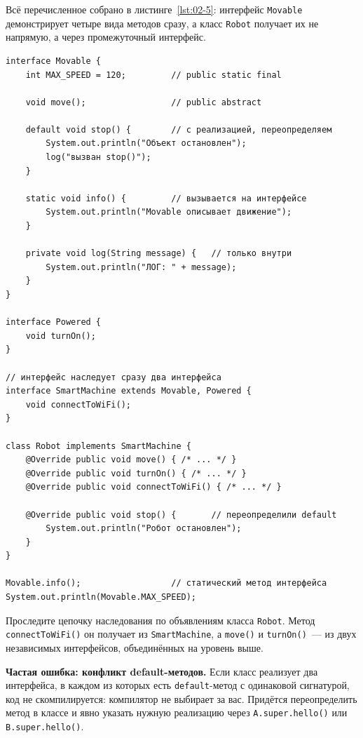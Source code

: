 Всё перечисленное собрано в листинге~\ref{lst:02-5}: интерфейс
\texttt{Movable} демонстрирует четыре вида методов сразу, а класс
\texttt{Robot} получает их не напрямую, а через промежуточный интерфейс.

\begin{listing}[H]
\begin{verbatim}
interface Movable {
    int MAX_SPEED = 120;         // public static final

    void move();                 // public abstract

    default void stop() {        // с реализацией, переопределяем
        System.out.println("Объект остановлен");
        log("вызван stop()");
    }

    static void info() {         // вызывается на интерфейсе
        System.out.println("Movable описывает движение");
    }

    private void log(String message) {   // только внутри
        System.out.println("ЛОГ: " + message);
    }
}

interface Powered {
    void turnOn();
}

// интерфейс наследует сразу два интерфейса
interface SmartMachine extends Movable, Powered {
    void connectToWiFi();
}

class Robot implements SmartMachine {
    @Override public void move() { /* ... */ }
    @Override public void turnOn() { /* ... */ }
    @Override public void connectToWiFi() { /* ... */ }

    @Override public void stop() {       // переопределили default
        System.out.println("Робот остановлен");
    }
}

Movable.info();                  // статический метод интерфейса
System.out.println(Movable.MAX_SPEED);
\end{verbatim}
\caption{Четыре вида методов интерфейса и множественное наследование}
\label{lst:02-5}
\end{listing}

Проследите цепочку наследования по объявлениям класса \texttt{Robot}. Метод
\texttt{connectToWiFi()} он получает из \texttt{SmartMachine}, а
\texttt{move()} и \texttt{turnOn()}~--- из двух независимых интерфейсов,
объединённых на уровень выше.

\begin{oshibka}
\textbf{Частая ошибка: конфликт default-методов.} Если класс реализует два
интерфейса, в каждом из которых есть \texttt{default}-метод с одинаковой
сигнатурой, код не скомпилируется: компилятор не выбирает за вас. Придётся
переопределить метод в классе и явно указать нужную реализацию через
\texttt{A.super.hello()} или \texttt{B.super.hello()}.
\end{oshibka}


